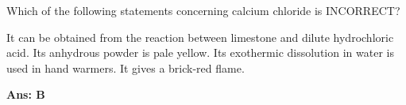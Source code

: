 \documentclass[border=3pt,varwidth=70mm]{standalone}
\begin{document}
 
Which of the following statements concerning calcium chloride is INCORRECT?

\begin{choices}
\choice It can be obtained from the reaction between limestone and dilute hydrochloric acid.
\choice Its anhydrous powder is pale yellow.
\choice Its exothermic dissolution in water is used in hand warmers.
\choice It gives a brick-red flame.
\end{choices}

\begin{answer}
\hrulefill\par
\textbf{Ans: B}

\end{answer}
\end{document}

